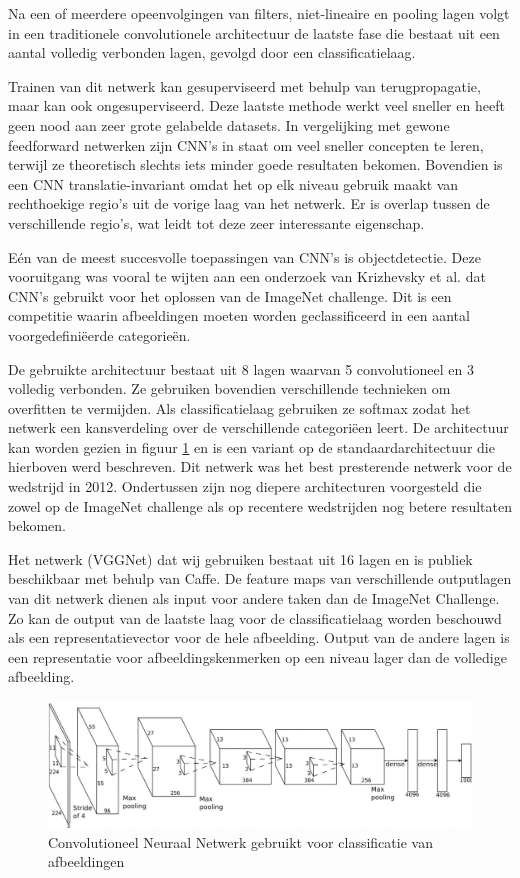 Na een of meerdere opeenvolgingen van filters, niet-lineaire en pooling lagen volgt in een traditionele convolutionele architectuur de laatste fase die bestaat uit een aantal volledig verbonden lagen, gevolgd door een classificatielaag.

Trainen van dit netwerk kan gesuperviseerd met behulp van terugpropagatie, maar kan ook ongesuperviseerd. Deze laatste methode werkt veel sneller en heeft geen nood aan zeer grote gelabelde datasets. 
In vergelijking met gewone feedforward netwerken zijn CNN's in staat om veel sneller concepten te leren, terwijl ze theoretisch slechts iets minder goede resultaten bekomen.
Bovendien is een CNN translatie-invariant omdat het op elk niveau gebruik maakt van rechthoekige regio's uit de vorige laag van het netwerk. Er is overlap tussen de verschillende regio's, wat leidt tot deze zeer interessante eigenschap.

E\'en van de meest succesvolle toepassingen van CNN's is objectdetectie. Deze vooruitgang was vooral te wijten aan een onderzoek van Krizhevsky et al.\cite{Krizhevsky2012a} dat CNN's gebruikt voor het oplossen van de ImageNet challenge\cite{Russakovsky2014}.
Dit is een competitie waarin afbeeldingen moeten worden geclassificeerd in een aantal voorgedefini\"eerde categorie\"en. 

De gebruikte architectuur bestaat uit 8 lagen waarvan 5 convolutioneel en 3 volledig verbonden. Ze gebruiken bovendien verschillende technieken om overfitten te vermijden. Als classificatielaag gebruiken ze softmax zodat het netwerk een kansverdeling over de verschillende categori\"een leert. De architectuur kan worden gezien in figuur \ref{fig:AlexNet} en  is een variant op de standaardarchitectuur die hierboven werd beschreven. Dit netwerk was het best presterende netwerk voor de wedstrijd in 2012. Ondertussen zijn nog diepere architecturen voorgesteld die zowel op de ImageNet challenge als op recentere wedstrijden nog betere resultaten bekomen.

Het netwerk (VGGNet)\cite{Arge2015} dat wij gebruiken bestaat uit 16 lagen en is publiek beschikbaar met behulp van Caffe\cite{Jia2014}. De feature maps van verschillende outputlagen van dit netwerk dienen als input voor andere taken dan de ImageNet Challenge. Zo kan de output van de laatste laag voor de classificatielaag worden beschouwd als een representatievector voor de hele afbeelding. Output van de andere lagen is een representatie voor afbeeldingskenmerken op een niveau lager dan de volledige afbeelding.
\begin{figure}[tb]
	\centering
	\includegraphics[width=\linewidth]{Images/cnn.PNG}
	\caption{Convolutioneel Neuraal Netwerk gebruikt voor classificatie van afbeeldingen\cite{Krizhevsky2012a}}
	\label{fig:AlexNet}
\end{figure}

